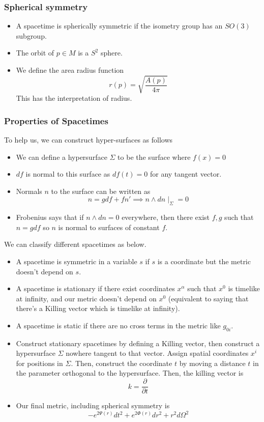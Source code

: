 \documentclass[11pt, oneside]{article}   	%
\theoremstyle{slanted}
\begin{document}
\subsubsection*{Spherical symmetry}
\begin{itemize}
	\item A spacetime is spherically symmetric if 
		the isometry group has an $ SO ( 3 ) $ subgroup. 
	\item The orbit of $ p \in M $ is a $  S ^ 2 $ sphere. 
	\item We define the area radius function
		\[
			r ( p )  = \sqrt{ \frac{ A( p ) }{ 4 \pi }} 
		\] This has the interpretation of radius. 
\end{itemize}
\subsubsection*{Properties of Spacetimes}

To help us, we can construct hyper-surfaces as follows 
\begin{itemize}
	\item We can define a hypersurface $ \Sigma $ to be the surface where $ f ( x )  = 0$
	\item $df $ is normal to this surface as $ df ( t ) = 0 $ for any tangent vector. 
	\item Normals $ n $ to the surface can be written as 
		\[
		 n = g df + f n' \implies n \wedge  dn \mid_{ \Sigma }  =0 
		\] 
	\item Frobenius says that if $ n \wedge  dn  =0  $  everywhere, then 
		there exist $ f, g $ such that $ n = g d f$ so $ n $ is 
		normal to surfaces of constant $ f $. 


\end{itemize}
We can classify different spacetimes as below. 
\begin{itemize}
	\item A spacetime is symmetric in a 
		variable $ s $ if $ s $ is a coordinate
		but the metric doesn't depend on $ s $. 
	\item A spacetime is stationary if there exist coordinates $ x ^ \alpha $ 
		such that $  x^ 0$ is timelike at infinity, and our metric 
		doesn't depend on $ x^ 0 $ (equivalent to saying that there's a Killing vector
		which is timelike at infinity). 
	\item A spacetime is static if there are no cross terms in the metric like 
		$ g _{ 0i } $. 
	\item Construct stationary spacetimes by defining a Killing vector, 
		then construct a hypersurface $ \Sigma $ nowhere tangent to 
		that vector. Assign spatial coordinates $ x ^ i $ for positions in 
		$ \Sigma $. Then, construct 
		the coordinate $ t $ by moving a distance $ t $ in the parameter
		orthogonal to the hypersurface. Then, the killing vector is 
		\[
		 k = \frac{\partial   }{\partial  t } 
		\] 
	\item Our final metric, including spherical symmetry is 
		\[
			- e ^{  2 \Psi ( r ) } dt ^ 2 + e^{ 2 \Phi ( r ) } dr ^ 2 + r ^ 2 d \Omega ^ 2 
		\] 
\end{itemize}
\end{document}
